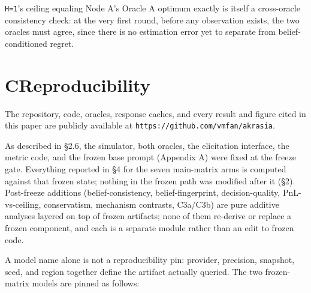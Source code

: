 \documentclass[
  10pt,
]{article}
\newcounter{none} %
\begin{document}
\texttt{H=1}'s ceiling equaling Node A's Oracle A optimum exactly is itself a cross-oracle consistency check: at the very first round, before any observation exists, the two oracles must agree, since there is no estimation error yet to separate from belief-conditioned regret.

\section{C\quad Reproducibility}\label{c-reproducibility}

The repository, code, oracles, response caches, and every result and figure cited in this paper are publicly available at \texttt{https://github.com/vmfan/akrasia}.

As described in §2.6, the simulator, both oracles, the elicitation interface, the metric code, and the frozen base prompt (Appendix A) were fixed at the freeze gate. Everything reported in §4 for the seven main-matrix arms is computed against that frozen state; nothing in the frozen path was modified after it (§2). Post-freeze additions (belief-consistency, belief-fingerprint, decision-quality, PnL-vs-ceiling, conservatism, mechanism contrasts, C3a/C3b) are pure additive analyses layered on top of frozen artifacts; none of them re-derive or replace a frozen component, and each is a separate module rather than an edit to frozen code.

A model name alone is not a reproducibility pin: provider, precision, snapshot, seed, and region together define the artifact actually queried. The two frozen-matrix models are pinned as follows:
\end{document}

